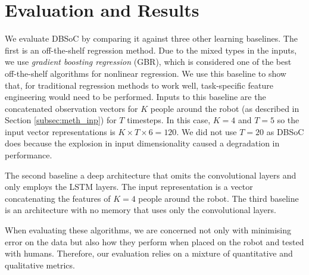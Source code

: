 \documentclass[letterpaper, 10 pt, conference]{ieeeconf}
\begin{document}


\section{Evaluation and Results}
We evaluate DBSoC by comparing it against three other learning baselines. The first is an off-the-shelf regression method. Due to the mixed types in the inputs, we use \emph{gradient boosting regression} (GBR), which  is considered one of the best off-the-shelf algorithms for nonlinear regression. We use this baseline to show that, for traditional regression methods to work well, task-specific feature engineering would need to be performed. Inputs to this baseline are the concatenated observation vectors for $K$ people around the robot (as described in Section \ref{subsec:meth_inp}) for $T$ timesteps. In this case, $K=4$ and $T =5$ so the input vector representations is $K\times T \times 6 = 120$. We did not use $T=20$ as DBSoC does because the explosion in input dimensionality caused a degradation in performance. 

The second baseline a deep architecture that omits the convolutional layers and only employs the LSTM layers. The input representation is a vector concatenating the features of $K=4$ people around the robot. The third baseline is an architecture with no memory that uses only the convolutional layers.

When evaluating these algorithms, we are concerned not only with minimising error on the data but also how they perform when placed on the robot and tested with humans. Therefore, our evaluation relies on a mixture of quantitative and qualitative metrics. 
\end{document}
